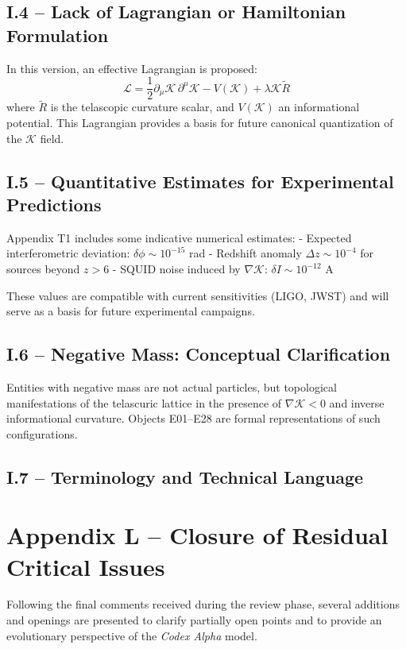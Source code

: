 \documentclass[12pt]{article}
\begin{document}
\subsection*{I.4 – Lack of Lagrangian or Hamiltonian Formulation}

In this version, an effective Lagrangian is proposed:
\[
\mathcal{L} = \frac{1}{2} \partial_\mu \mathcal{K} \, \partial^\mu \mathcal{K} - V(\mathcal{K}) + \lambda \mathcal{K} \tilde{R}
\]
where $\tilde{R}$ is the telascopic curvature scalar, and $V(\mathcal{K})$ an informational potential. This Lagrangian provides a basis for future canonical quantization of the $\mathcal{K}$ field.

\subsection*{I.5 – Quantitative Estimates for Experimental Predictions}

Appendix T1 includes some indicative numerical estimates:
- Expected interferometric deviation: $\delta \phi \sim 10^{-15}$ rad
- Redshift anomaly $\Delta z \sim 10^{-4}$ for sources beyond $z > 6$
- SQUID noise induced by $\nabla \mathcal{K}$: $\delta I \sim 10^{-12}$ A

These values are compatible with current sensitivities (LIGO, JWST) and will serve as a basis for future experimental campaigns.

\subsection*{I.6 – Negative Mass: Conceptual Clarification}

Entities with negative mass are not actual particles, but topological manifestations of the telascuric lattice in the presence of $\nabla \mathcal{K} < 0$ and inverse informational curvature. Objects E01–E28 are formal representations of such configurations.

\subsection*{I.7 – Terminology and Technical Language}

\section*{Appendix L – Closure of Residual Critical Issues}

Following the final comments received during the review phase, several additions and openings are presented to clarify partially open points and to provide an evolutionary perspective of the \textit{Codex Alpha} model.
\end{document}
